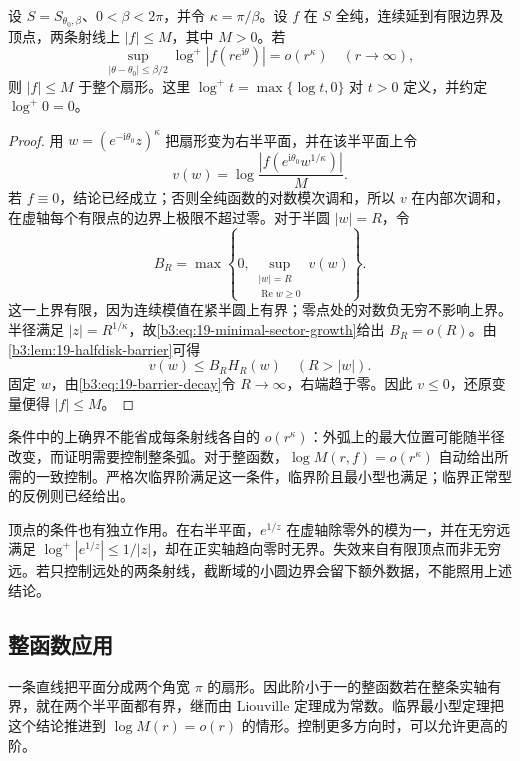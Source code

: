 \begin{theorem}\label{b3:thm:19-pl-minimal}
设 \(S=S_{\theta_0,\beta}\)、\(0<\beta<2\pi\)，并令 \(\kappa=\pi/\beta\)。设 \(f\) 在 \(S\) 全纯，连续延到有限边界及顶点，两条射线上 \(|f|\le M\)，其中 \(M>0\)。若
\begin{equation}\label{b3:eq:19-minimal-sector-growth}
 \sup_{|\theta-\theta_0|\le\beta/2}
 \log^+|f(re^{\mathrm i\theta})|=o(r^\kappa)
 \quad(r\to\infty),
\end{equation}
则 \(|f|\le M\) 于整个扇形。这里 \(\log^+t=\max\{\log t,0\}\) 对 \(t>0\) 定义，并约定 \(\log^+0=0\)。
\end{theorem}
\begin{proof}
用 \(w=(e^{-\mathrm i\theta_0}z)^\kappa\) 把扇形变为右半平面，并在该半平面上令
\[
 v(w)=\log\frac{|f(e^{\mathrm i\theta_0}w^{1/\kappa})|}{M}.
\]
若 \(f\equiv0\)，结论已经成立；否则全纯函数的对数模次调和，所以 \(v\) 在内部次调和，在虚轴每个有限点的边界上极限不超过零。对于半圆 \(|w|=R\)，令
\[
 B_R=\max\left\{0,\sup_{\substack{|w|=R\\\operatorname{Re}w\ge0}}v(w)\right\}.
\]
这一上界有限，因为连续模值在紧半圆上有界；零点处的对数负无穷不影响上界。半径满足 \(|z|=R^{1/\kappa}\)，故\eqref{b3:eq:19-minimal-sector-growth}给出 \(B_R=o(R)\)。由\cref{b3:lem:19-halfdisk-barrier}可得
\[
 v(w)\le B_R H_R(w)\quad(R>|w|).
\]
固定 \(w\)，由\eqref{b3:eq:19-barrier-decay}令 \(R\to\infty\)，右端趋于零。因此 \(v\le0\)，还原变量便得 \(|f|\le M\)。
\end{proof}

条件中的上确界不能省成每条射线各自的 \(o(r^\kappa)\)：外弧上的最大位置可能随半径改变，而证明需要控制整条弧。对于整函数，\(\log M(r,f)=o(r^\kappa)\) 自动给出所需的一致控制。严格次临界阶满足这一条件，临界阶且最小型也满足；临界正常型的反例则已经给出。

\ProseParagraphBreak

顶点的条件也有独立作用。在右半平面，\(e^{1/z}\) 在虚轴除零外的模为一，并在无穷远满足 \(\log^+|e^{1/z}|\le1/|z|\)，却在正实轴趋向零时无界。失效来自有限顶点而非无穷远。若只控制远处的两条射线，截断域的小圆边界会留下额外数据，不能照用上述结论。

\subsection{整函数应用}
\label{b3:subsec:190403}

一条直线把平面分成两个角宽 \(\pi\) 的扇形。因此阶小于一的整函数若在整条实轴有界，就在两个半平面都有界，继而由 Liouville 定理成为常数。临界最小型定理把这个结论推进到 \(\log M(r)=o(r)\) 的情形。控制更多方向时，可以允许更高的阶。


